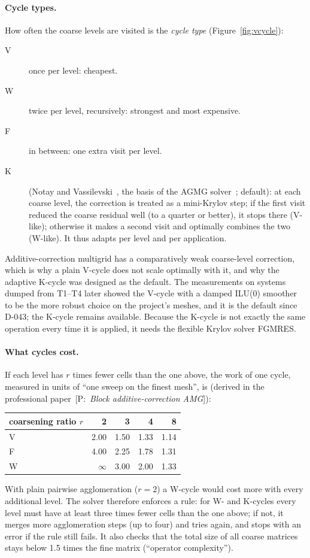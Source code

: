 \documentclass[11pt,a4paper]{article}
\newcommand{\pro}[1]{\ {\small[P:~\textit{#1}]}}
\begin{document}
\paragraph{Cycle types.} How often the coarse levels are visited is the
\emph{cycle type} (Figure~\ref{fig:vcycle}):
\begin{description}
\item[V] once per level: cheapest.
\item[W] twice per level, recursively: strongest and most expensive.
\item[F] in between: one extra visit per level.
\item[K] (Notay and Vassilevski~\cite{NotayVassilevski2008}, the basis of
  the AGMG solver~\cite{Notay2010}; default): at each coarse level, the
  correction is treated as a mini-Krylov step; if the first visit reduced
  the coarse residual well (to a quarter or better), it stops there
  (V-like); otherwise it makes a second visit and optimally combines the
  two (W-like). It thus adapts per level and per application.
\end{description}
Additive-correction multigrid has a comparatively weak coarse-level
correction, which is why a plain V-cycle does not scale optimally with it,
and why the adaptive K-cycle was designed as the default. The measurements
on systems dumped from T1--T4 later showed the V-cycle with a damped ILU(0)
smoother to be the more robust choice on the project's meshes, and it is
the default since D-043; the K-cycle remains available. Because the K-cycle is not
exactly the same operation every time it is applied, it needs the flexible
Krylov solver FGMRES.

\paragraph{What cycles cost.} If each level has $r$ times fewer cells than
the one above, the work of one cycle, measured in units of ``one sweep on
the finest mesh'', is (derived in the professional paper\pro{Block additive-correction AMG}):
\begin{center}\small
\begin{tabular}{lrrrr}
\toprule
coarsening ratio $r$ & 2 & 3 & 4 & 8\\
\midrule
V & 2.00 & 1.50 & 1.33 & 1.14\\
F & 4.00 & 2.25 & 1.78 & 1.31\\
W & $\infty$ & 3.00 & 2.00 & 1.33\\
\bottomrule
\end{tabular}
\end{center}
With plain pairwise agglomeration ($r=2$) a W-cycle would cost more with
every additional level. The solver therefore enforces a rule: for W- and
K-cycles every level must have at least three times fewer cells than the
one above; if not, it merges more agglomeration steps (up to four) and
tries again, and stops with an error if the rule still fails. It also
checks that the total size of all coarse matrices stays below 1.5 times the
fine matrix (``operator complexity'').
\end{document}
